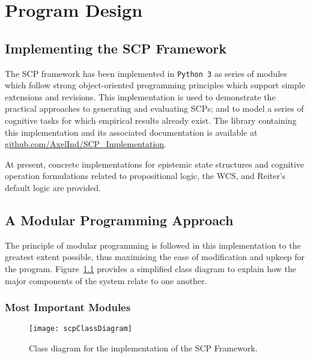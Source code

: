 \chapter{Program Design} \label{chp:program}
\section{Implementing the SCP Framework}

The SCP framework has been implemented in \texttt{Python 3} as series of modules which follow strong object-oriented programming principles which support simple extensions and revisions. This implementation is used to demonstrate the practical approaches to generating and evaluating SCPs; and to model a series of cognitive tasks for which empirical results already exist. The library containing this implementation and its associated documentation is available at \href{https://github.com/AxelInd/SCP_Implementation}{github.com/AxelInd/SCP\_Implementation}.

At present, concrete implementations for epistemic state structures and cognitive operation formulations related to propositional logic, the WCS, and Reiter's default logic are provided.

\section{A Modular Programming Approach}
The principle of modular programming is followed in this implementation to the greatest extent possible, thus maximising the ease of modification and upkeep for the program. Figure~\ref{fig:scpClassDiagram} provides a simplified class diagram to explain how the major components of the system relate to one another.

\subsection{Most Important Modules}

\begin{figure}
\centering \texttt{[image: scpClassDiagram]}
\caption{Class diagram for the implementation of the SCP Framework.}
\label{fig:scpClassDiagram}
\end{figure}

